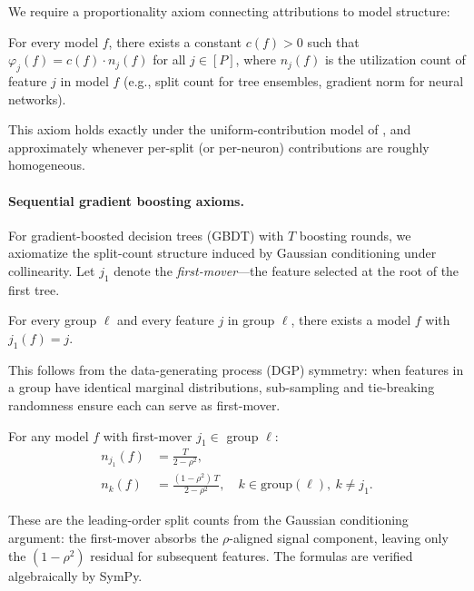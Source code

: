 \documentclass{jmlr}
\newcommand{\GBDT}{\textsc{GBDT}}
\begin{document}
We require a proportionality axiom connecting attributions to model structure:

\begin{axiom}[Proportionality]
\label{ax:proportional}
For every model $f$, there exists a constant $c(f) > 0$ such that $\varphi_j(f) = c(f) \cdot n_j(f)$ for all $j \in [P]$, where $n_j(f)$ is the utilization count of feature $j$ in model $f$ (e.g., split count for tree ensembles, gradient norm for neural networks).
\end{axiom}

This axiom holds exactly under the uniform-contribution model of \citet{lundberg2017unified}, and approximately whenever per-split (or per-neuron) contributions are roughly homogeneous.

\paragraph{Sequential gradient boosting axioms.}
For gradient-boosted decision trees (\GBDT{}) with $T$ boosting rounds, we axiomatize the split-count structure induced by Gaussian conditioning under collinearity.
Let $j_1$ denote the \emph{first-mover}---the feature selected at the root of the first tree.

\begin{axiom}
\label{ax:surjective}
For every group $\ell$ and every feature $j$ in group $\ell$, there exists a model $f$ with $j_1(f) = j$.
\end{axiom}

This follows from the data-generating process (DGP) symmetry: when features in a group have identical marginal distributions, sub-sampling and tie-breaking randomness ensure each can serve as first-mover.

\begin{axiom}
\label{ax:splits}
For any model $f$ with first-mover $j_1 \in$ group $\ell$:
\begin{align}
    n_{j_1}(f) &= \frac{T}{2 - \rho^2}, \label{eq:splits-first} \\
    n_{k}(f) &= \frac{(1-\rho^2)\,T}{2 - \rho^2}, \quad k \in \text{group}(\ell),\ k \neq j_1. \label{eq:splits-other}
\end{align}
\end{axiom}

These are the leading-order split counts from the Gaussian conditioning argument: the first-mover absorbs the $\rho$-aligned signal component, leaving only the $(1-\rho^2)$ residual for subsequent features.
The formulas are verified algebraically by SymPy.
\end{document}
